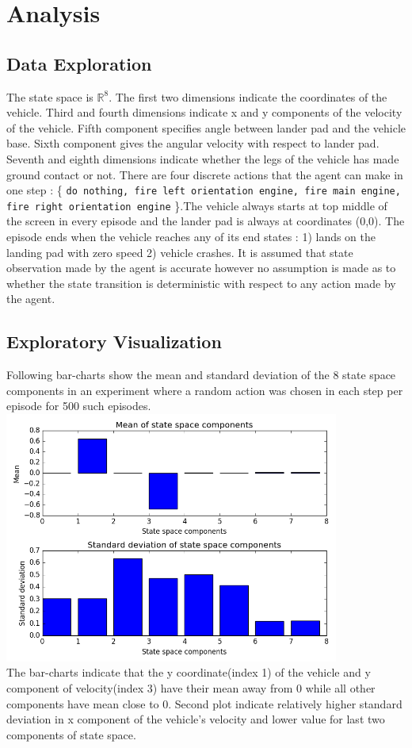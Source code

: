 \documentclass{svproc}
\begin{document}
\section{Analysis}
\subsection*{Data Exploration}
The state space is $\mathbb{R}^8$. The first two dimensions indicate the coordinates of the vehicle. Third and fourth dimensions indicate x and y components of the velocity of the vehicle. Fifth component specifies angle between lander pad and the vehicle base. Sixth component gives the angular velocity with respect to lander pad. Seventh and eighth dimensions indicate whether the legs of the vehicle has made ground contact or not. There are four discrete actions that the agent can make in one step : \{ \texttt{do nothing, fire left orientation engine, fire main engine, fire right orientation engine} \}.The vehicle always starts at top middle of the screen in every episode and the lander pad is always at coordinates (0,0). The episode ends when the vehicle reaches any of its end states : 1) lands on the landing pad with zero speed 2) vehicle crashes. It is assumed that state observation made by the agent is accurate however no assumption is made as to whether the state transition is deterministic with respect to any action made by the agent.
\subsection*{Exploratory Visualization}
Following bar-charts show the mean and standard deviation of the 8 state space components in an experiment where a random action was chosen in each step per episode for 500 such episodes.\\
\includegraphics[width=11cm]{img/state-space}\\
The bar-charts indicate that the y coordinate(index 1) of the vehicle and y component of velocity(index 3) have their mean away from 0 while all other components have mean close to 0. Second plot indicate relatively higher standard deviation in x component of the vehicle's velocity and lower value for last two components of state space.
\end{document}
